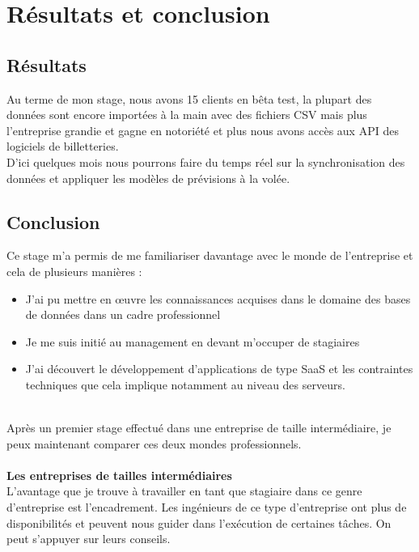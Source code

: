 \chapter{Résultats et conclusion}

\section{Résultats}
Au terme de mon stage, nous avons 15 clients en bêta test, la plupart des données sont encore importées à la main avec des fichiers CSV mais plus l'entreprise grandie et gagne en notoriété et plus nous avons accès aux API des logiciels de billetteries.
\\

D'ici quelques mois nous pourrons faire du temps réel sur la synchronisation des données et appliquer les modèles de prévisions à la volée.

\section{Conclusion}
Ce stage m'a permis de me familiariser davantage avec le monde de l'entreprise et cela de plusieurs manières :
	\begin{itemize} 
		\item[\textbullet] J'ai pu mettre en œuvre les connaissances acquises dans le domaine des bases de données dans un cadre professionnel
		\item[\textbullet]Je me suis initié au management en devant m'occuper de stagiaires
		\item[\textbullet]J'ai découvert le développement d'applications de type SaaS et les contraintes techniques que cela implique notamment au niveau des serveurs. 
	\end{itemize} 
\leavevmode \\
Après un premier stage effectué dans une entreprise de taille intermédiaire, je peux maintenant comparer ces deux mondes professionnels.
\\ \\
\textbf{Les entreprises de tailles intermédiaires}
\\
L'avantage que je trouve à travailler en tant que stagiaire dans ce genre d'entreprise est l'encadrement.
Les ingénieurs de ce type d'entreprise ont plus de disponibilités et peuvent nous guider dans l'exécution de certaines tâches. On peut s'appuyer sur leurs conseils. 

